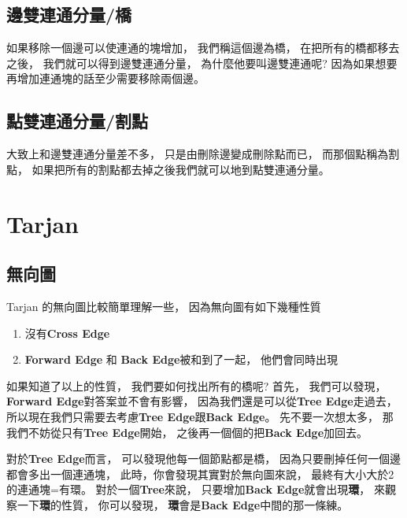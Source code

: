 \documentclass[12pt,oneside]{article}
\begin{document}
\subsection{邊雙連通分量/橋}

如果移除一個邊可以使連通的塊增加，
我們稱這個邊為橋，
在把所有的橋都移去之後，
我們就可以得到邊雙連通分量，
為什麼他要叫邊雙連通呢?
因為如果想要再增加連通塊的話至少需要移除兩個邊。



\subsection{點雙連通分量/割點}

大致上和邊雙連通分量差不多，
只是由刪除邊變成刪除點而已，
而那個點稱為割點，
如果把所有的割點都去掉之後我們就可以地到點雙連通分量。



\clearpage
\section{Tarjan}
\subsection{無向圖}

Tarjan 的無向圖比較簡單理解一些，
因為無向圖有如下幾種性質
\vspace*{1em}
\begin{adjustwidth}{2em}{0em}
\begin{enumerate}
    \item 沒有\textbf{Cross Edge} 
    \item \textbf{Forward Edge} 和 \textbf{Back Edge}被和到了一起，
            他們會同時出現

\end{enumerate}
\end{adjustwidth}
\vspace*{1em}

如果知道了以上的性質，
我們要如何找出所有的橋呢?
首先，
我們可以發現，
\textbf{Forward Edge}對答案並不會有影響，
因為我們還是可以從\textbf{Tree Edge}走過去，
所以現在我們只需要去考慮\textbf{Tree Edge}跟\textbf{Back Edge}。
先不要一次想太多，
那我們不妨從只有\textbf{Tree Edge}開始，
之後再一個個的把\textbf{Back Edge}加回去。

對於\textbf{Tree Edge}而言，
可以發現他每一個節點都是橋，
因為只要刪掉任何一個邊都會多出一個連通塊，
此時，你會發現其實對於無向圖來說，
{\color{red} 最終有大小大於2的連通塊=有環}。
對於一個\textbf{Tree}來說，
只要增加\textbf{Back Edge}就會出現\textbf{環}，
來觀察一下\textbf{環}的性質，
你可以發現，
\textbf{環}會是\textbf{Back Edge}中間的那一條練。
\end{document}
